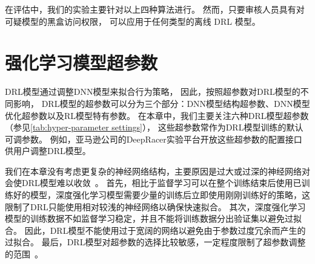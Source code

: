 在评估中，我们的实验主要针对以上四种算法进行。
然而，只要审核人员具有对可疑模型的黑盒访问权限，
\sysname 可以应用于任何类型的离线 DRL 模型。


\section{强化学习模型超参数}
\begin{table}[!t]
    \caption{超参数总结}
    \label{tab:hyper-parameter settings}
    \centering
\end{table}
DRL模型通过调整DNN模型来拟合行为策略，
因此，按照超参数对DRL模型的不同影响，
DRL模型的超参数可以分为三个部分：DNN模型结构超参数、DNN模型优化超参数以及RL模型特有参数。
在本章中，我们主要关注六种DRL模型超参数（参见\autoref{tab:hyper-parameter settings}），
这些超参数常作为DRL模型训练的默认可调参数。
例如，亚马逊公司的DeepRacer实验平台\cite{BMGGDKRSTTCMK19}开放这些超参数的配置接口供用户调整DRL模型。

我们在本章没有考虑更复杂的神经网络结构，主要原因是过大或过深的神经网络对会使DRL模型难以收敛~\cite{ota2020can}。
首先，相比于监督学习可以在整个训练结束后使用已训练好的模型，深度强化学习模型需要少量的训练后立即使用刚刚训练好的策略，这限制了DRL只能使用相对较浅的神经网络以确保快速拟合。
其次，深度强化学习模型的训练数据不如监督学习稳定，并且不能将训练数据分出验证集以避免过拟合。
因此，DRL模型不能使用过于宽阔的网络以避免由于参数过度冗余而产生的过拟合。
最后，DRL模型对超参数的选择比较敏感，一定程度限制了超参数调整的范围~\cite{henderson2018deep}。





